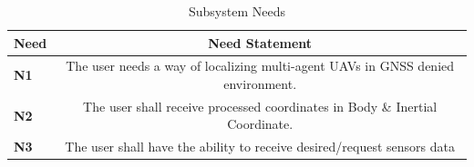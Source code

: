 \begin{table}[H]
\centering
\begin{tabular}{|l|c|}
\hline
\textbf{Need} & \textbf{Need Statement}                                                                                                                   \\ \hline
\textbf{N1}        & The user needs a way of localizing multi-agent UAVs in GNSS denied environment.

\\ \hline
\textbf{N2}      & The user shall receive processed coordinates in Body \& Inertial Coordinate.\\ \hline
\textbf{N3}        & The user shall have the ability to receive desired/request sensors data                                                                                                       \\ \hline
\end{tabular}
\caption{Subsystem Needs}
\label{tab:User Needs}
\end{table}


